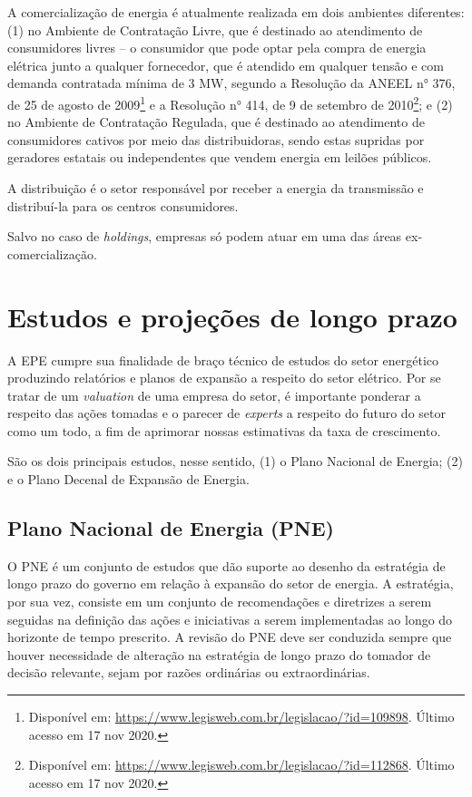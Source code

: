 \documentclass[grad,numbers]{coppe}
\begin{document}
  A comercialização de energia é atualmente realizada em dois ambientes diferentes: (1) no Ambiente de Contratação Livre, que é destinado ao atendimento de consumidores livres -- o consumidor que pode optar pela compra de energia elétrica junto a qualquer fornecedor, que é atendido em qualquer tensão e com demanda contratada mínima de 3 MW, segundo a Resolução da ANEEL n° 376, de 25 de agosto de 2009\footnote{Disponível em: \url{https://www.legisweb.com.br/legislacao/?id=109898}. Último acesso em 17 nov 2020.} e a Resolução n° 414, de 9 de setembro de 2010\footnote{Disponível em: \url{https://www.legisweb.com.br/legislacao/?id=112868}. Último acesso em 17 nov 2020.}; e (2) no Ambiente de Contratação Regulada, que é destinado ao atendimento de consumidores cativos por meio das distribuidoras, sendo estas supridas por geradores estatais ou independentes que vendem energia em leilões públicos.

  A distribuição é o setor responsável por receber a energia da transmissão e distribuí-la para os centros consumidores.

  Salvo no caso de \emph{holdings}, empresas só podem atuar em uma das áreas ex-comercialização.

  \hypertarget{estudos-e-projeuxe7uxf5es-de-longo-prazo}{%
  \section{Estudos e projeções de longo prazo}\label{estudos-e-projeuxe7uxf5es-de-longo-prazo}}

  A EPE cumpre sua finalidade de braço técnico de estudos do setor energético produzindo relatórios e planos de expansão a respeito do setor elétrico. Por se tratar de um \emph{valuation} de uma empresa do setor, é importante ponderar a respeito das ações tomadas e o parecer de \emph{experts} a respeito do futuro do setor como um todo, a fim de aprimorar nossas estimativas da taxa de crescimento.

  São os dois principais estudos, nesse sentido, (1) o Plano Nacional de Energia; (2) e o Plano Decenal de Expansão de Energia.

  \hypertarget{plano-nacional-de-energia-pne}{%
  \subsection{Plano Nacional de Energia (PNE)}\label{plano-nacional-de-energia-pne}}

  O PNE é um conjunto de estudos que dão suporte ao desenho da estratégia de longo prazo do governo em relação à expansão do setor de energia. A estratégia, por sua vez, consiste em um conjunto de recomendações e diretrizes a serem seguidas na definição das ações e iniciativas a serem implementadas ao longo do horizonte de tempo prescrito. A revisão do PNE deve ser conduzida sempre que houver necessidade de alteração na estratégia de longo prazo do tomador de decisão relevante, sejam por razões ordinárias ou extraordinárias.
\end{document}
